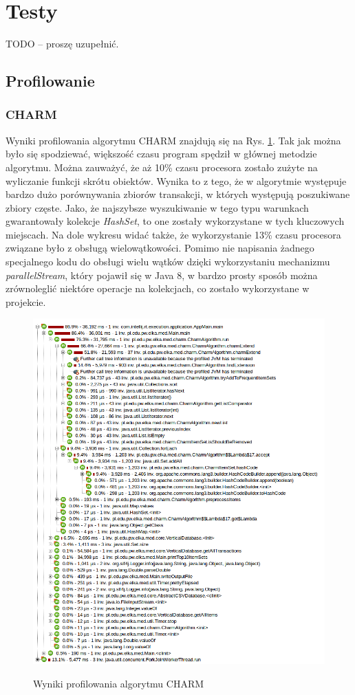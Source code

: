 \section{Testy}

TODO -- proszę uzupełnić.

\subsection{Profilowanie}

\subsubsection{CHARM}

Wyniki profilowania algorytmu CHARM znajdują się na Rys. \ref{charm:profil}. Tak jak można było się spodziewać, większość czasu program spędził w głównej metodzie algorytmu. Można zauważyć, że aż 10\% czasu procesora zostało zużyte na wyliczanie funkcji skrótu obiektów. Wynika to z tego, że w algorytmie występuje bardzo dużo porównywania zbiorów transakcji, w których występują poszukiwane zbiory częste. Jako, że najszybsze wyszukiwanie w tego typu warunkach gwarantowały kolekcje \emph{HashSet}, to one zostały wykorzystane w tych kluczowych miejscach. Na dole wykresu widać także, że wykorzystanie 13\% czasu procesora związane było z obsługą wielowątkowości. Pomimo nie napisania żadnego specjalnego kodu do obsługi wielu wątków dzięki wykorzystaniu mechanizmu \emph{parallelStream}, który pojawił się w Java 8, w bardzo prosty sposób można zrównoleglić niektóre operacje na kolekcjach, co zostało wykorzystane w projekcie.

\begin{figure}
\caption{Wyniki profilowania algorytmu CHARM}
\includegraphics[width=17cm]{res/charm-profi.png}
\label{charm:profil}
\end{figure}

